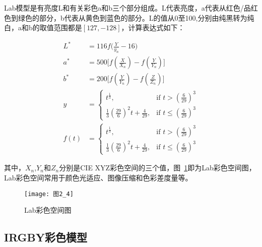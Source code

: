 Lab模型是有亮度L和有关彩色a和b三个部分组成。L代表亮度，a代表从红色/品红色到绿色的部分，b代表从黄色到蓝色的部分。L的值从0至100,分别由纯黑转为纯白，a和b的取值范围都是$[127,-128]$，计算表达式如下：
\begin{linenomath}
\begin{align}
L^{*} &= 116f\big(\frac{Y}{y_{n}}-16\big)\label{式2_1}\\
a^{*} &= 500\big[f(\frac{X}{X_{n}})-f(\frac{Y}{Y_{n}})\big]\label{式2_2}\\
b^{*} &= 200\big[f(\frac{Y}{Y_{n}})-f(\frac{Z}{Z_{n}})\big]\label{式2_3}\\
y &= \left\{ \begin{array}{ll}
t^{\frac{1}{3}}, & \textrm{if $t>(\frac{6}{29})^{3}$}\\
\frac{1}{3}(\frac{29}{6})^{2}t+\frac{4}{29}, & \textrm{if $t\leq (\frac{6}{29})^{3}$}
\end{array} \right.\label{式2_4}\\
f(t) &= \left\{ \begin{array}{ll}
t^{\frac{1}{3}}, & \textrm{if $t>(\frac{6}{29})^{3}$}\\
\frac{1}{3}(\frac{29}{6})^{2}t+\frac{4}{29}, & \textrm{if $t\leq (\frac{6}{29})^{3}$}
\end{array} \right.\label{式2_5}
\end{align}
\end{linenomath}
其中，$X_{n}$,$Y_{n}$和$Z_{n}$分别是CIE XYZ彩色空间的三个值，图~\ref{图2_4}即为Lab彩色空间图，Lab彩色空间常用于颜色光适应、图像压缩和色彩差度量等。
\begin{figure}[h]
  \centering
  \texttt{[image: 图2\_4]}
  \caption{Lab彩色空间图}
  \label{图2_4}    
\end{figure}

\subsection{IRGBY彩色模型}
\label{2_1_3}

